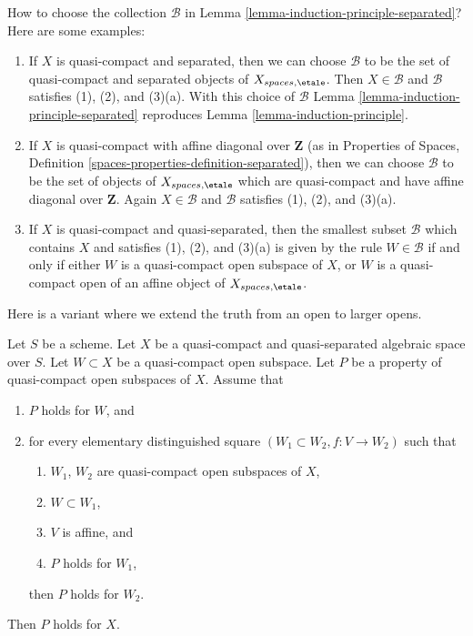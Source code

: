 \begin{remark}
\label{remark-how-to}
How to choose the collection $\mathcal{B}$ in
Lemma \ref{lemma-induction-principle-separated}?
Here are some examples:
\begin{enumerate}
\item If $X$ is quasi-compact and separated, then we can choose
$\mathcal{B}$ to be the set of quasi-compact and separated objects
of $X_{spaces, \etale}$. Then $X \in \mathcal{B}$ and $\mathcal{B}$
satisfies (1), (2), and (3)(a). With this choice of $\mathcal{B}$
Lemma \ref{lemma-induction-principle-separated} reproduces
Lemma \ref{lemma-induction-principle}.
\item If $X$ is quasi-compact with affine diagonal
over $\mathbf{Z}$ (as in Properties of Spaces, Definition
\ref{spaces-properties-definition-separated}), then we can choose
$\mathcal{B}$ to be the set of objects
of $X_{spaces, \etale}$ which are quasi-compact and have affine
diagonal over $\mathbf{Z}$. Again $X \in \mathcal{B}$ and $\mathcal{B}$
satisfies (1), (2), and (3)(a).
\item If $X$ is quasi-compact and quasi-separated, then the
smallest subset $\mathcal{B}$ which contains $X$ and satisfies
(1), (2), and (3)(a) is given by the rule $W \in \mathcal{B}$ if and only
if either $W$ is a quasi-compact open subspace of $X$, or
$W$ is a quasi-compact open of an affine object of $X_{spaces, \etale}$.
\end{enumerate}
\end{remark}

\noindent
Here is a variant where we extend the truth from an open to larger opens.

\begin{lemma}
\label{lemma-induction-principle-enlarge}
Let $S$ be a scheme. Let $X$ be a quasi-compact and quasi-separated
algebraic space over $S$. Let $W \subset X$ be a quasi-compact open
subspace. Let $P$ be a property of quasi-compact open subspaces of $X$.
Assume that
\begin{enumerate}
\item $P$ holds for $W$, and
\item for every elementary distinguished square
$(W_1 \subset W_2, f : V \to W_2)$
such that
\begin{enumerate}
\item $W_1$, $W_2$ are quasi-compact open subspaces of $X$,
\item $W \subset W_1$,
\item $V$ is affine, and
\item $P$ holds for $W_1$,
\end{enumerate}
then $P$ holds for $W_2$.
\end{enumerate}
Then $P$ holds for $X$.
\end{lemma}

